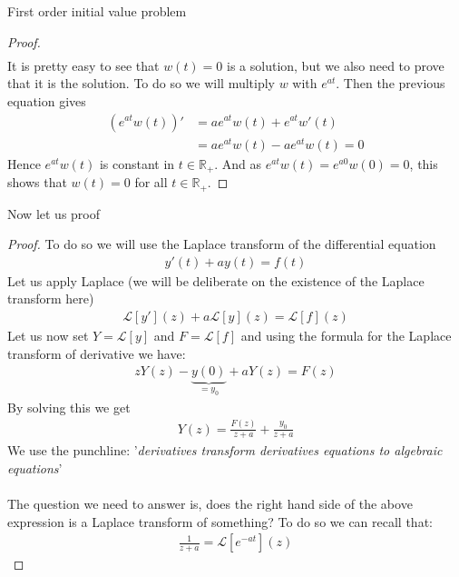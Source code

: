 \begin{parag}{First order initial value problem}
\begin{proof}
\begin{align*}
	\end{align*}
	It is pretty easy to see that $w\left(t\right) = 0$ is a solution, but we also need to prove that it is the  solution. To do so we will multiply $w$ with $e^{at}$. Then the previous equation gives 
	\begin{align*} 
		\left(e^{at}w\left(t\right)\right)' &= ae^{at}w\left(t\right) + e^{at}w'\left(t\right)\\
			&= ae^{at} w\left(t\right) - ae^{at}w\left(t\right) = 0
	\end{align*}
	Hence $e^{at}w\left(t\right)$ is constant in $t \in \mathbb{R}_+$. And as $e^{at}w\left(t\right) = e^{a0}w\left(0\right) = 0$, this shows that $w\left(t\right) = 0 $ for all $t \in \mathbb{R}_+$.
	\end{proof}
	Now let us proof 
	\begin{proof}
	    To do so we will use the Laplace transform of the differential equation 
		\begin{align*} 
			y'\left(t\right) + ay\left(t\right) = f\left(t\right)
		\end{align*}
		Let us apply Laplace (we will be deliberate on the existence of the Laplace transform here)
		\begin{align*} 
			\mathcal{L}\left[y'\right]\left(z\right) + a\mathcal{L}\left[y\right]\left(z\right) = \mathcal{L}\left[f\right]\left(z\right)
		\end{align*}
		Let us now set $Y =  \mathcal{L}\left[y\right]$ and $F =  \mathcal{L}\left[f\right]$ and using the formula for the Laplace transform of derivative we have:
		\begin{align*} 
			z Y\left(z\right) -\underbrace{y\left(0\right)}_{=  y_0} + a Y\left(z\right) =  F\left(z\right)
		\end{align*}
		By solving this we get 
		\begin{align*} 
			Y\left(z\right) = \frac{F\left(z\right)}{z + a} + \frac{y_0}{z + a}
		\end{align*}
		We use the punchline: '\textit{derivatives transform derivatives equations to algebraic equations}'\\
		$ $\\
		The question we need to answer is, does the right hand side of the above expression is a Laplace transform of something? To do so we can recall that:
		\begin{align*} 
			\frac{1}{z + a} =  \mathcal{L}\left[e^{-at}\right]\left(z\right)
		\end{align*}

\end{proof}
\end{parag}
